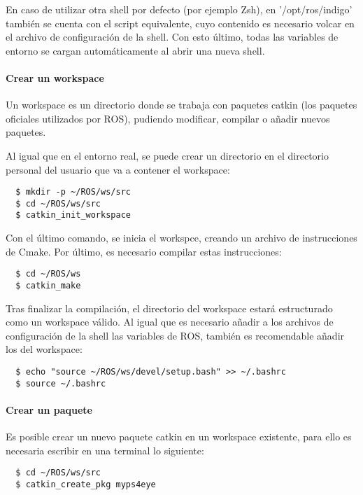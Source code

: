 En caso de utilizar otra shell por defecto (por ejemplo Zsh), en 
'/opt/ros/indigo' también se cuenta con el script equivalente, cuyo contenido es
necesario volcar en el archivo de configuración de la shell. Con esto último,
todas las variables de entorno se cargan automáticamente al abrir una nueva
shell.

\paragraph{Crear un workspace} \hspace{0pt}

Un workspace es un directorio donde se trabaja con paquetes catkin (los paquetes
oficiales utilizados por ROS), pudiendo modificar, compilar o añadir nuevos
paquetes.

Al igual que en el entorno real, se puede crear un directorio en el directorio
personal del usuario que va a contener el workspace:
\\
\begin{lstlisting}
  $ mkdir -p ~/ROS/ws/src
  $ cd ~/ROS/ws/src
  $ catkin_init_workspace
\end{lstlisting}

Con el último comando, se inicia el workspce, creando un archivo de
instrucciones de Cmake. Por último, es necesario compilar estas instrucciones:
\\
\begin{lstlisting}
  $ cd ~/ROS/ws
  $ catkin_make
\end{lstlisting}

Tras finalizar la compilación, el directorio del workspace estará estructurado
como un workspace válido. Al igual que es necesario añadir a los archivos de
configuración de la shell las variables de ROS, también es recomendable añadir
los del workspace:
\\
\begin{lstlisting}
  $ echo "source ~/ROS/ws/devel/setup.bash" >> ~/.bashrc
  $ source ~/.bashrc
\end{lstlisting}

\paragraph{Crear un paquete} \hspace{0pt}

Es posible crear un nuevo paquete catkin en un workspace existente, para ello es
necesaria escribir en una terminal lo siguiente:
\\
\begin{lstlisting}
  $ cd ~/ROS/ws/src
  $ catkin_create_pkg myps4eye
\end{lstlisting}

